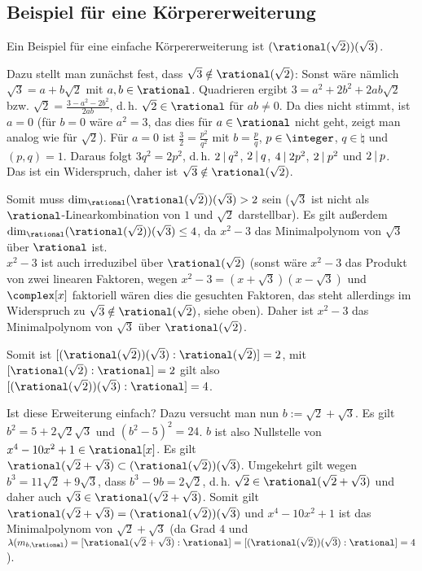 \subsection{%
    Beispiel für eine Körpererweiterung%
}

\begin{Bsp}
    Ein Beispiel für eine einfache Körpererweiterung ist
    $(\rational(\sqrt{2}))(\sqrt{3})$.

    Dazu stellt man zunächst fest, dass $\sqrt{3} \notin \rational(\sqrt{2})$:
    Sonst wäre nämlich $\sqrt{3} = a + b\sqrt{2}$ mit $a, b \in \rational$.
    Quadrieren ergibt $3 = a^2 + 2b^2 + 2ab\sqrt{2}$ bzw.
    $\sqrt{2} = \frac{3 - a^2 - 2b^2}{2ab}$, d.\,h. $\sqrt{2} \in \rational$
    für $ab \not= 0$.
    Da dies nicht stimmt, ist $a = 0$
    (für $b = 0$ wäre $a^2 = 3$, das dies für $a \in \rational$ nicht geht,
    zeigt man analog wie für $\sqrt{2}$).
    Für $a = 0$ ist $\frac{3}{2} = \frac{p^2}{q^2}$ mit $b = \frac{p}{q}$,
    $p \in \integer$, $q \in \natural$ und $(p, q) = 1$.
    Daraus folgt $3q^2 = 2p^2$, d.\,h. $2 \mathbin{|} q^2$,
    $2 \mathbin{|} q$, $4 \mathbin{|} 2p^2$, $2 \mathbin{|} p^2$ und $2 \mathbin{|} p$.\\
    Das ist ein Widerspruch, daher ist $\sqrt{3} \notin \rational(\sqrt{2})$.

    Somit muss $\dim_\rational (\rational(\sqrt{2}))(\sqrt{3}) > 2$ sein
    ($\sqrt{3}$ ist nicht als $\rational$-Linearkombination von
    $1$ und $\sqrt{2}$ darstellbar).
    Es gilt außerdem $\dim_\rational (\rational(\sqrt{2}))(\sqrt{3}) \le 4$,
    da $x^2 - 3$ das Minimalpolynom von $\sqrt{3}$ über $\rational$ ist.\\
    $x^2 - 3$ ist auch irreduzibel über $\rational(\sqrt{2})$
    (sonst wäre $x^2 - 3$ das Produkt von zwei linearen Faktoren,
    wegen $x^2 - 3 = (x + \sqrt{3})(x - \sqrt{3})$ und $\complex[x]$
    faktoriell wären dies die gesuchten Faktoren, das steht allerdings im
    Widerspruch zu $\sqrt{3} \notin \rational(\sqrt{2})$, siehe oben).
    Daher ist $x^2 - 3$ das Minimalpolynom von
    $\sqrt{3}$ über $\rational(\sqrt{2})$.

    Somit ist $[(\rational(\sqrt{2}))(\sqrt{3}) : \rational(\sqrt{2})] = 2$,
    mit $[\rational(\sqrt{2}) : \rational] = 2$ gilt also
    $[(\rational(\sqrt{2}))(\sqrt{3}) : \rational] = 4$.

    Ist diese Erweiterung einfach?
    Dazu versucht man nun $b := \sqrt{2} + \sqrt{3}$.
    Es gilt $b^2 = 5 + 2\sqrt{2}\sqrt{3}$ und $(b^2 - 5)^2 = 24$.
    $b$ ist also Nullstelle von $x^4 - 10x^2 + 1 \in \rational[x]$.
    Es gilt $\rational(\sqrt{2} + \sqrt{3}) \subset
    (\rational(\sqrt{2}))(\sqrt{3})$.
    Umgekehrt gilt wegen $b^3 = 11\sqrt{2} + 9\sqrt{3}$, dass
    $b^3 - 9b = 2\sqrt{2}$, d.\,h.
    $\sqrt{2} \in \rational(\sqrt{2} + \sqrt{3})$ und daher auch
    $\sqrt{3} \in \rational(\sqrt{2} + \sqrt{3})$.
    Somit gilt $\rational(\sqrt{2} + \sqrt{3}) =
    (\rational(\sqrt{2}))(\sqrt{3})$ und
    $x^4 - 10x^2 + 1$ ist das Minimalpolynom von $\sqrt{2} + \sqrt{3}$
    (da Grad $4$ und\\
    $\lambda(m_{b,\rational}) =
    [\rational(\sqrt{2} + \sqrt{3}) : \rational] =
    [(\rational(\sqrt{2}))(\sqrt{3}) : \rational] = 4$).
\end{Bsp}

